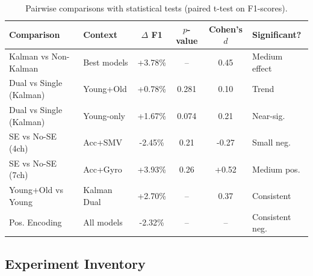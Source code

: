\documentclass{article}
\begin{document}
\begin{table}[htbp]
    \centering
    \caption{Pairwise comparisons with statistical tests (paired t-test on F1-scores).}
    \label{tab:statistical_summary}
    \begin{tabular}{llcccl}
        \toprule
        \textbf{Comparison} & \textbf{Context} & \textbf{$\Delta$ F1} & \textbf{$p$-value} & \textbf{Cohen's $d$} & \textbf{Significant?} \\
        \midrule
        Kalman vs Non-Kalman & Best models & +3.78\% & -- & 0.45 & Medium effect \\
        Dual vs Single (Kalman) & Young+Old & +0.78\% & 0.281 & 0.10 & Trend \\
        Dual vs Single (Kalman) & Young-only & +1.67\% & 0.074 & 0.21 & Near-sig. \\
        SE vs No-SE (4ch) & Acc+SMV & -2.45\% & 0.21 & -0.27 & Small neg. \\
        SE vs No-SE (7ch) & Acc+Gyro & +3.93\% & 0.26 & +0.52 & Medium pos. \\
        Young+Old vs Young & Kalman Dual & +2.70\% & -- & 0.37 & Consistent \\
        Pos. Encoding & All models & -2.32\% & -- & -- & Consistent neg. \\
        \bottomrule
    \end{tabular}
\end{table}

\subsection{Experiment Inventory}
\end{document}
